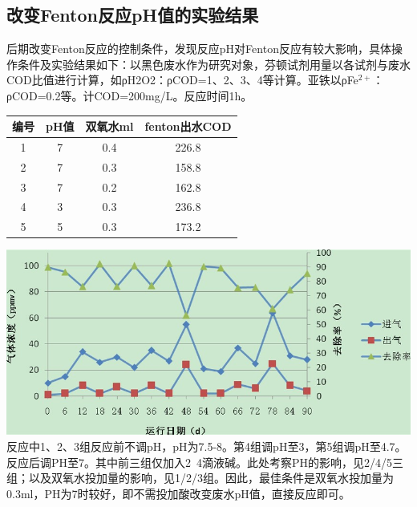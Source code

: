 \subsection{改变Fenton反应pH值的实验结果}
后期改变Fenton反应的控制条件，发现反应pH对Fenton反应有较大影响，具体操作条件及实验结果如下：以黑色废水作为研究对象，芬顿试剂用量以各试剂与废水COD比值进行计算，如ρH2O2：ρCOD=1、2、3、4等计算。亚铁以ρFe$^{2+}$：ρCOD=0.2等。计COD=200mg/L。反应时间1h。\par
\begin{center}
\label{tab3}
\begin{tabular}{| c | c | c | c |}
    \hline
    编号 & pH值 & 双氧水ml & fenton出水COD\\ \hline 
    1 & 7 & 0.4 & 226.8\\ \hline 
    2 & 7 & 0.3 & 158.8\\ \hline 
    3 & 7 & 0.2 & 162.8\\ \hline 
    4 & 3 & 0.3 & 236.8\\ \hline 
    5 & 5 & 0.3 & 173.2\\ \hline     
\end{tabular}
\end{center}
\setlength{\parindent}{2em}
{
    \centering 
    \includegraphics[width=150mm]{Img/fig2.jpg}
    \label{fig2}
}
反应中1、2、3组反应前不调pH，pH为7.5-8。第4组调pH至3，第5组调pH至4.7。反应后调PH至7。其中前三组仅加入2~4滴液碱。此处考察PH的影响，见2/4/5三组；以及双氧水投加量的影响，见1/2/3组。因此，最佳条件是双氧水投加量为0.3ml，PH为7时较好，即不需投加酸改变废水pH值，直接反应即可。\par
